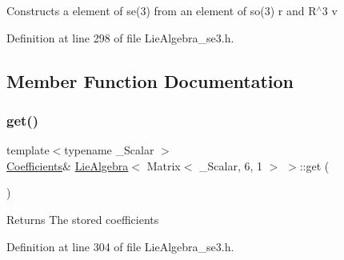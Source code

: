 Constructs a element of se(3) from an element of so(3) {\ttfamily r} and R$^\wedge$3 {\ttfamily v} 

Definition at line 298 of file Lie\+Algebra\+\_\+se3.\+h.



\subsection{Member Function Documentation}
\hypertarget{class_lie_algebra_3_01_matrix_3_01___scalar_00_016_00_011_01_4_01_4_aab00bfaad297d5857dc63fd84c5eed39}{}\label{class_lie_algebra_3_01_matrix_3_01___scalar_00_016_00_011_01_4_01_4_aab00bfaad297d5857dc63fd84c5eed39} 
\subsubsection{\texorpdfstring{get()}{get()}\hspace{0.1cm}{\footnotesize\ttfamily [1/2]}}
{\footnotesize\ttfamily template$<$typename \+\_\+\+Scalar $>$ \\
\hyperlink{class_lie_algebra_3_01_matrix_3_01___scalar_00_016_00_011_01_4_01_4_a2eb9bb9a54a2c7ce0b75b46814ea390e}{Coefficients}\& \hyperlink{class_lie_algebra}{Lie\+Algebra}$<$ Matrix$<$ \+\_\+\+Scalar, 6, 1 $>$ $>$\+::get (\begin{DoxyParamCaption}{ }\end{DoxyParamCaption})\hspace{0.3cm}{\ttfamily [inline]}}

\begin{DoxyReturn}{Returns}
The stored coefficients 
\end{DoxyReturn}


Definition at line 304 of file Lie\+Algebra\+\_\+se3.\+h.

\hypertarget{class_lie_algebra_3_01_matrix_3_01___scalar_00_016_00_011_01_4_01_4_a8bc6089b5724706b3b3ae5a52dad7c30}{}\label{class_lie_algebra_3_01_matrix_3_01___scalar_00_016_00_011_01_4_01_4_a8bc6089b5724706b3b3ae5a52dad7c30} 
